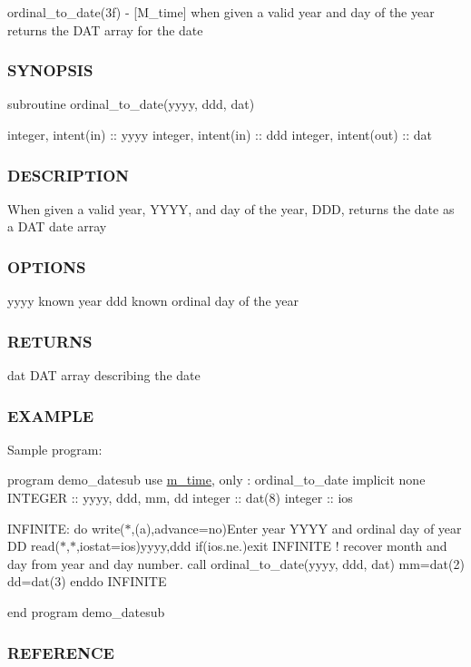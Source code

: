 \begin{DoxyVerb}
ordinal\+\_\+to\+\_\+date(3f) -\/ \mbox{[}M\+\_\+time\mbox{]} when given a valid year and day of the year returns the D\+AT array for the date \subsubsection*{S\+Y\+N\+O\+P\+S\+IS}

subroutine ordinal\+\_\+to\+\_\+date(yyyy, ddd, dat)

integer, intent(in) \+:\+: yyyy integer, intent(in) \+:\+: ddd integer, intent(out) \+:\+: dat \subsubsection*{D\+E\+S\+C\+R\+I\+P\+T\+I\+ON}

When given a valid year, Y\+Y\+YY, and day of the year, D\+DD, returns the date as a D\+AT date array \subsubsection*{O\+P\+T\+I\+O\+NS}

yyyy known year ddd known ordinal day of the year \subsubsection*{R\+E\+T\+U\+R\+NS}

dat D\+AT array describing the date \subsubsection*{E\+X\+A\+M\+P\+LE}

Sample program\+:

program demo\+\_\+datesub use \hyperlink{namespacem__time}{m\+\_\+time}, only \+: ordinal\+\_\+to\+\_\+date implicit none I\+N\+T\+E\+G\+ER \+:\+: yyyy, ddd, mm, dd integer \+:\+: dat(8) integer \+:\+: ios

I\+N\+F\+I\+N\+I\+TE\+: do write($\ast$,\textquotesingle{}(a)\textquotesingle{},advance=\textquotesingle{}no\textquotesingle{})\textquotesingle{}Enter year Y\+Y\+YY and ordinal day of year DD \textquotesingle{} read($\ast$,$\ast$,iostat=ios)yyyy,ddd if(ios.\+ne.)exit I\+N\+F\+I\+N\+I\+TE ! recover month and day from year and day number. call ordinal\+\_\+to\+\_\+date(yyyy, ddd, dat) mm=dat(2) dd=dat(3) enddo I\+N\+F\+I\+N\+I\+TE

end program demo\+\_\+datesub

\subsubsection*{R\+E\+F\+E\+R\+E\+N\+CE}


\end{DoxyVerb}
